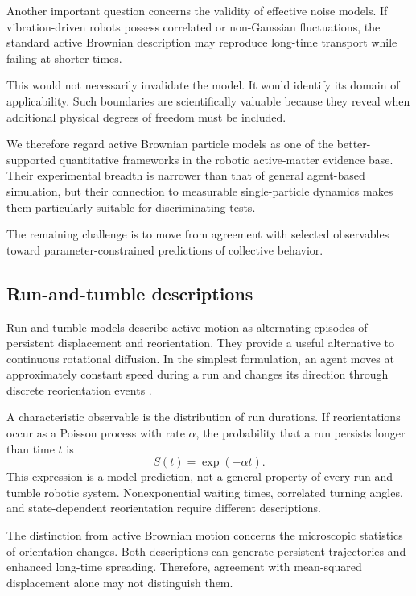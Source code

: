 Another important
question concerns
the validity of
effective noise models.
If vibration-driven
robots possess
correlated or
non-Gaussian fluctuations,
the standard active
Brownian description
may reproduce
long-time transport
while failing
at shorter times.

This would not
necessarily invalidate
the model.
It would identify
its domain of
applicability.
Such boundaries
are scientifically
valuable because
they reveal when
additional physical
degrees of freedom
must be included.

We therefore regard
active Brownian particle
models as one of
the better-supported
quantitative frameworks
in the robotic
active-matter evidence
base. Their experimental
breadth is narrower
than that of general
agent-based simulation,
but their connection
to measurable
single-particle
dynamics makes
them particularly
suitable for
discriminating tests.

The remaining challenge
is to move from
agreement with
selected observables
toward parameter-constrained
predictions of
collective behavior.

\subsection{Run-and-tumble descriptions}
\label{sec:theory-run-tumble}

Run-and-tumble models describe active motion as alternating
episodes of persistent displacement and reorientation.
They provide a useful alternative to continuous
rotational diffusion. In the simplest formulation,
an agent moves at approximately constant speed
during a run and changes its direction through
discrete reorientation events
\cite{Tailleur2008runtumble}.

A characteristic observable is the distribution
of run durations. If reorientations occur as
a Poisson process with rate $\alpha$,
the probability that a run persists
longer than time $t$ is
\begin{equation}
S(t)=\exp(-\alpha t).
\label{eq:theory-run-tumble}
\end{equation}
This expression is a model prediction,
not a general property of every
run-and-tumble robotic system.
Nonexponential waiting times,
correlated turning angles,
and state-dependent reorientation
require different descriptions.

The distinction from active Brownian
motion concerns the microscopic
statistics of orientation changes.
Both descriptions can generate
persistent trajectories and
enhanced long-time spreading.
Therefore, agreement with
mean-squared displacement alone
may not distinguish them.

